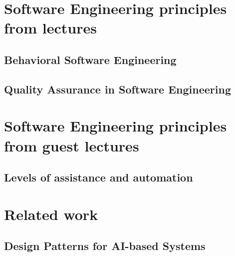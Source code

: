 \documentclass[a4paper,twocolumn]{article}
\begin{document}
\section*{Software Engineering principles from lectures}

\subsection*{Behavioral Software Engineering}

\subsection*{Quality Assurance in Software Engineering}

\section*{Software Engineering principles from guest lectures}

\subsection*{Levels of assistance and automation}

\section*{Related work}


\subsection*{Design Patterns for AI-based Systems}
\end{document}
